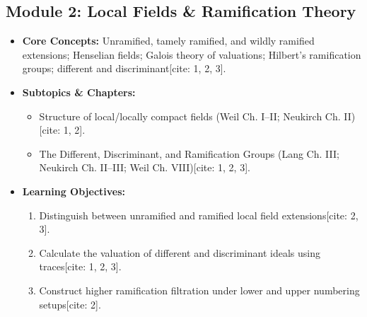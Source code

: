 \documentclass[11pt,a4paper]{article}
\begin{document}
\subsection*{Module 2: Local Fields \& Ramification Theory}
\begin{itemize}[leftmargin=*]
    \item \textbf{Core Concepts:} Unramified, tamely ramified, and wildly ramified extensions; Henselian fields; Galois theory of valuations; Hilbert's ramification groups; different and discriminant[cite: 1, 2, 3].
    \item \textbf{Subtopics \& Chapters:}
    \begin{itemize}
        \item Structure of local/locally compact fields (Weil Ch. I--II; Neukirch Ch. II)[cite: 1, 2].
        \item The Different, Discriminant, and Ramification Groups (Lang Ch. III; Neukirch Ch. II--III; Weil Ch. VIII)[cite: 1, 2, 3].
    \end{itemize}
    \item \textbf{Learning Objectives:}
    \begin{enumerate}
        \item Distinguish between unramified and ramified local field extensions[cite: 2, 3].
        \item Calculate the valuation of different and discriminant ideals using traces[cite: 1, 2, 3].
        \item Construct higher ramification filtration under lower and upper numbering setups[cite: 2].
    \end{enumerate}
\end{itemize}
\end{document}
